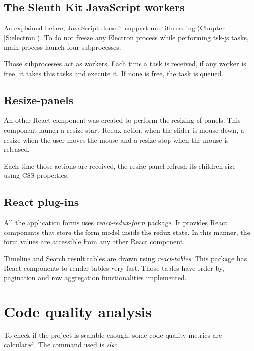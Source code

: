 \subsection{The Sleuth Kit JavaScript workers}

As explained before, JavaScript doesn't support multithreading (Chapter
\ref{S:electron}). To do not freeze any Electron process while performing
tsk-js tasks, main process launch four subprocesses.

Those subprocesses act as workers. Each time a task is received, if any worker
is free, it takes this tasks and execute it. If none is free, the task is 
queued.

\subsection{Resize-panels}

An other React component was created to perform the resizing of panels. This
component launch a resize-start Redux action when the slider is mouse down, a
resize when the user moves the mouse and a resize-stop when the mouse is 
released.

Each time those actions are received, the resize-panel refresh its children
size using CSS properties.

\subsection{React plug-ins}

All the application forms uses \textit{react-redux-form} package. It provides
React components that store the form model inside the redux state. In this
manner, the form values are accessible from any other React component.

Timeline and Search result tables are drawn using \textit{react-tables}. This 
package has React components to render tables very fast. Those tables have 
order by, pagination and row aggregation functionalities implemented.

\section{Code quality analysis}


To check if the project is scalable enough, some code quality metrics are 
calculated. The command used is \textit{sloc}.


